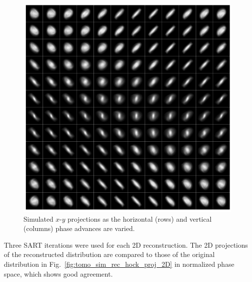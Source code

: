 \begin{figure}[!p]
    \centering
    \includegraphics[width=\textwidth]{Images/chapter4/tomo_sim_target_scan_full.png}
    \caption{Simulated $x$-$y$ projections as the horizontal (rows) and vertical (columns) phase advances are varied.}
    \label{fig:tomo_sim_target_scan}
\end{figure}
%
Three SART iterations were used for each 2D reconstruction. The 2D projections of the reconstructed distribution are compared to those of the original distribution in Fig.~\ref{fig:tomo_sim_rec_hock_proj_2D} in normalized phase space, which shows good agreement.
%
